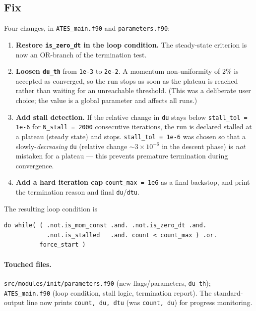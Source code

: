 \documentclass[english,a4paper]{kiseon_memo}
\begin{document}
\subsection{Fix}
Four changes, in \texttt{ATES\_main.f90} and \texttt{parameters.f90}:
\begin{enumerate}
\item \textbf{Restore \texttt{is\_zero\_dt} in the loop condition.} The
  steady-state criterion is now an OR-branch of the termination test.
\item \textbf{Loosen \texttt{du\_th}} from \verb|1e-3| to \verb|2e-2|. A momentum
  non-uniformity of 2\% is accepted as converged, so the run stops as soon as the
  plateau is reached rather than waiting for an unreachable threshold. (This was a
  deliberate user choice; the value is a global parameter and affects all runs.)
\item \textbf{Add stall detection.} If the relative change in \texttt{du} stays
  below \verb|stall_tol = 1e-6| for \verb|N_stall = 2000| consecutive iterations,
  the run is declared stalled at a plateau (steady state) and stops.
  \verb|stall_tol = 1e-6| was chosen so that a slowly-\emph{decreasing} \texttt{du}
  (relative change $\sim 3\times10^{-6}$ in the descent phase) is \emph{not}
  mistaken for a plateau --- this prevents premature termination during convergence.
\item \textbf{Add a hard iteration cap} \verb|count_max = 1e6| as a final backstop,
  and print the termination reason and final \texttt{du}/\texttt{dtu}.
\end{enumerate}
The resulting loop condition is
\begin{lstlisting}
do while( ( .not.is_mom_const .and. .not.is_zero_dt .and.
            .not.is_stalled   .and. count < count_max ) .or.
          force_start )
\end{lstlisting}

\paragraph{Touched files.} \texttt{src/modules/init/parameters.f90} (new
flags/parameters, \texttt{du\_th}); \texttt{ATES\_main.f90} (loop condition, stall
logic, termination report). The standard-output line now prints
\texttt{count, du, dtu} (was \texttt{count, du}) for progress monitoring.
\end{document}

